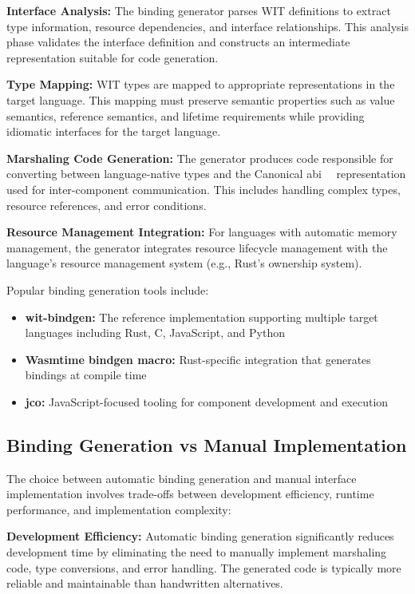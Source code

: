 \textbf{Interface Analysis:} The binding generator parses WIT definitions to extract type information, resource dependencies, and interface relationships. This analysis phase validates the interface definition and constructs an intermediate representation suitable for code generation.

\textbf{Type Mapping:} WIT types are mapped to appropriate representations in the target language. This mapping must preserve semantic properties such as value semantics, reference semantics, and lifetime requirements while providing idiomatic interfaces for the target language.

\textbf{Marshaling Code Generation:} The generator produces code responsible for converting between language-native types and the Canonical \acrfull{abi}~\cite{abi}~\cite{cabi} representation used for inter-component communication. This includes handling complex types, resource references, and error conditions.

\textbf{Resource Management Integration:} For languages with automatic memory management, the generator integrates resource lifecycle management with the language's resource management system (e.g., Rust's ownership system).

Popular binding generation tools include:

\begin{itemize}
    \item \textbf{wit-bindgen:} The reference implementation supporting multiple target languages including Rust, C, JavaScript, and Python
    \item \textbf{Wasmtime bindgen macro:} Rust-specific integration that generates bindings at compile time
    \item \textbf{jco:} JavaScript-focused tooling for component development and execution
\end{itemize}

\subsection{Binding Generation vs Manual Implementation}
\label{subsec:binding-comparison}

The choice between automatic binding generation and manual interface implementation involves trade-offs between development efficiency, runtime performance, and implementation complexity:

\textbf{Development Efficiency:} Automatic binding generation significantly reduces development time by eliminating the need to manually implement marshaling code, type conversions, and error handling. The generated code is typically more reliable and maintainable than handwritten alternatives.

